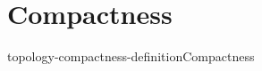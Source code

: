 \documentclass[preview]{standalone}
\begin{document}
\genpage

\section{Compactness}

\begin{snippetdefinition}{topology-compactness-definition}{Compactness}
    \todo
\end{snippetdefinition}
\end{document}

